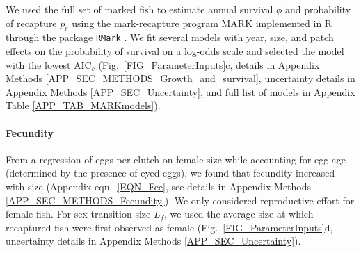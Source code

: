\documentclass[12pt, oneside]{article}   	%
\begin{document}

We used the full set of marked fish to estimate annual survival $\phi$ and probability of recapture $p_r$ using the mark-recapture program MARK implemented in R through the package \texttt{RMark} \citep{RMark_Laake2013}. We fit several models with year, size, and patch effects on the probability of survival on a log-odds scale and selected the model with the lowest $\text{AIC}_c$ (Fig.\ \ref{FIG_ParameterInputs}c, details in Appendix Methods \ref{APP_SEC_METHODS_Growth_and_survival}, uncertainty details in Appendix Methods \ref{APP_SEC_Uncertainty}, and full list of models in Appendix Table \ref{APP_TAB_MARKmodels}). %

\paragraph*{Fecundity}

From a regression of eggs per clutch on female size while accounting for egg age (determined by the presence of eyed eggs), we found that fecundity increased with size (Appendix eqn.\ \ref{EQN_Fec}, see details in Appendix Methods \ref{APP_SEC_METHODS_Fecundity}). We only considered reproductive effort for female fish. For sex transition size $L_f$, we used the average size at which recaptured fish were first observed as female (Fig.\ \ref{FIG_ParameterInputs}d, uncertainty details in Appendix Methods \ref{APP_SEC_Uncertainty}).
\end{document}
